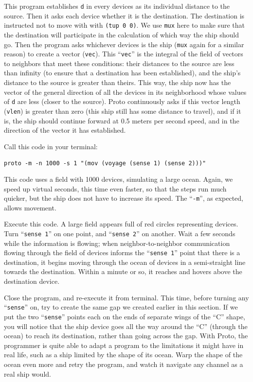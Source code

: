 \documentclass{article}
\newcommand\code[1]{\begin{center}\var{#1}\end{center}}
\newcommand\var[1]{{\tt #1}}
\newcommand\qvar[1]{``{\tt #1}''}
\begin{document}
This program establishes \var{d} in every devices as its individual
distance to the source.  Then it asks each device whether it is the
destination.  The destination is instructed not to move with with
\var{(tup 0 0)}.  We use \var{mux} here to make sure that the
destination will participate in the calculation of which way the ship
should go.  Then the program asks whichever devices is the ship
(\var{mux} again for a similar reason) to create a vector (\var{vec}).
This \qvar{vec} is the integral of the field of vectors to neighbors
that meet these conditions: their distances to the source are less
than infinity (to ensure that a destination has been established), and
the ship's distance to the source is greater than theirs.  This way,
the ship now has the vector of the general direction of all the
devices in its neighborhood whose values of \var{d} are less (closer
to the source).  Proto continuously asks if this vector length
(\var{vlen}) is greater than zero (this ship still has some distance
to travel), and if it is, the ship should continue forward at 0.5
meters per second speed, and in the direction of the vector it has
established.

Call this code in your terminal:

\code{proto -m -n 1000 -s 1 "(mov (voyage (sense 1) (sense 2)))"}

This code uses a field with 1000 devices, simulating a large
ocean.  Again, we speed up virtual seconds, this time even faster, so
that the steps run much quicker, but the ship does not have to
increase its speed.  The \qvar{-m}, as expected, allows movement.

Execute this code.  A large field appears full of red circles
representing devices.  Turn \qvar{sense 1} on one point, and
\qvar{sense 2} on another.  Wait a few seconds while the information
is flowing; when neighbor-to-neighbor communication flowing through
the field of devices informs the \qvar{sense 1} point that there is a
destination, it begins moving through the ocean of devices in a
semi-straight line towards the destination.  Within a minute or so, it
reaches and hovers above the destination device.

Close the program, and re-execute it from terminal.  This time, before
turning any \qvar{sense} on, try to create the same gap we created
earlier in this section.  If we put the two \qvar{sense} points each
on the ends of separate wings of the ``C'' shape, you will notice that
the ship device goes all the way around the ``C'' (through the ocean)
to reach its destination, rather than going across the gap.  With
Proto, the programmer is quite able to adapt a program to the
limitations it might have in real life, such as a ship limited by the
shape of its ocean.  Warp the shape of the ocean even more and retry
the program, and watch it navigate any channel as a real ship would.
\end{document}
